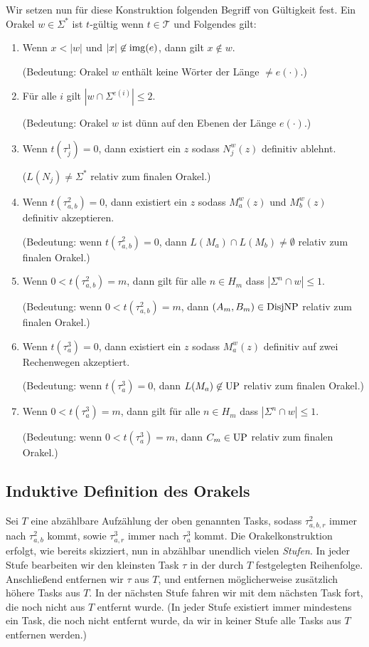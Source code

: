 Wir setzen nun für diese Konstruktion folgenden Begriff von Gültigkeit fest.
Ein Orakel $w\in\Sigma^*$ ist $t$-gültig wenn $t\in\mathcal T$ und Folgendes gilt:
\begin{enumerate}[label={V\arabic*},midpenalty=0]
    \item Wenn $x<|w|$ und $|x|\not\in \operatorname{img}(e)$, dann gilt $x\not\in w$.\par
        (Bedeutung: Orakel $w$ enthält keine Wörter der Länge $\neq e(\cdot)$.)
    \item Für alle $i$ gilt $|w\cap \Sigma^{e(i)}|\leq 2$.\par
        (Bedeutung: Orakel $w$ ist dünn auf den Ebenen der Länge $e(\cdot)$.)
    \item Wenn $t(\tau^1_j)=0$, dann existiert ein $z$ sodass $N_j^w(z)$ definitiv ablehnt.\par
        ($L(N_j)\neq \Sigma^*$ relativ zum finalen Orakel.)
    \item Wenn $t(\tau^2_{a,b})=0$, dann existiert ein $z$ sodass $M_a^w(z)$ und $M_b^w(z)$ definitiv akzeptieren.\par
        (Bedeutung: wenn $t(\tau^2_{a,b})=0$, dann $L(M_a)\cap L(M_b)\neq \emptyset$ relativ zum finalen Orakel.)
    \item Wenn $0<t(\tau^2_{a,b})=m$, dann gilt für alle $n\in H_m$ dass $|\Sigma^{n}\cap w|\leq 1$.\par
        (Bedeutung: wenn $0<t(\tau^2_{a,b})=m$, dann $(A_m,B_m)\in\mathrm{DisjNP}$ relativ zum finalen Orakel.)
    \item Wenn $t(\tau^3_{a})=0$, dann existiert ein $z$ sodass $M_a^w(z)$ definitiv auf zwei Rechenwegen akzeptiert.\par
        (Bedeutung: wenn $t(\tau^3_{a})=0$, dann $L(M_a)\not\in \mathrm{UP}$ relativ zum finalen Orakel.)
    \item Wenn $0<t(\tau^3_{a})=m$, dann gilt für alle $n\in H_m$ dass $|\Sigma^n\cap w|\leq 1$.\par
        (Bedeutung: wenn $0<t(\tau^3_{a})=m$, dann $C_m\in\mathrm{UP}$ relativ zum finalen Orakel.)
\end{enumerate}


\subsection*{Induktive Definition des Orakels}

Sei $T$ eine abzählbare Aufzählung der oben genannten Tasks, sodass $\tau^2_{a,b,r}$ immer nach $\tau^2_{a,b}$ kommt, sowie $\tau^3_{a,r}$ immer nach $\tau^3_a$ kommt.
Die Orakelkonstruktion erfolgt, wie bereits skizziert, nun in abzählbar unendlich vielen \emph{Stufen}. In jeder Stufe bearbeiten wir den kleinsten Task $\tau$ in der durch $T$ festgelegten Reihenfolge. Anschließend entfernen wir $\tau$ aus $T$, und entfernen möglicherweise zusätzlich höhere Tasks aus $T$.
In der nächsten Stufe fahren wir mit dem nächsten Task fort, die noch nicht aus $T$ entfernt wurde. (In jeder Stufe existiert immer mindestens ein Task, die noch nicht entfernt wurde, da wir in keiner Stufe alle Tasks aus $T$ entfernen werden.)

